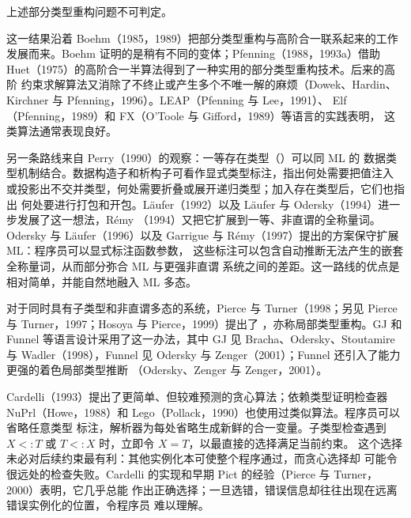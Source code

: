 \begin{theorem}[Pfenning，1993a]
\label{thm:23.6.2}
上述部分类型重构问题不可判定。
\end{theorem}

这一结果沿着 Boehm（1985，1989）把部分类型重构与高阶合一联系起来的工作
发展而来。Boehm 证明的是稍有不同的变体；Pfenning（1988，1993a）借助
Huet（1975）的高阶合一半算法得到了一种实用的部分类型重构技术。后来的高阶
约束求解算法又消除了不终止或产生多个不唯一解的麻烦（Dowek、Hardin、
Kirchner 与 Pfenning，1996）。LEAP（Pfenning 与 Lee，1991）、
Elf（Pfenning，1989）和 FX（O'Toole 与 Gifford，1989）等语言的实践表明，
这类算法通常表现良好。


另一条路线来自 Perry（1990）的观察：一等存在类型（）可以同 ML 的
数据类型机制结合。数据构造子和析构子可看作显式类型标注，指出何处需要把值注入
或投影出不交并类型，何处需要折叠或展开递归类型；加入存在类型后，它们也指出
何处要进行打包和开包。Läufer（1992）以及 Läufer 与 Odersky（1994）进一步发展了这一想法，Rémy
（1994）又把它扩展到一等、非直谓的全称量词。Odersky 与 Läufer（1996）以及
Garrigue 与 Rémy（1997）提出的方案保守扩展 ML：程序员可以显式标注函数参数，
这些标注可以包含自动推断无法产生的嵌套全称量词，从而部分弥合 ML 与更强非直谓
系统之间的差距。这一路线的优点是相对简单，并能自然地融入 ML 多态。

对于同时具有子类型和非直谓多态的系统，Pierce 与 Turner（1998；另见 Pierce
与 Turner，1997；Hosoya 与 Pierce，1999）提出了
，亦称局部类型重构。GJ 和
Funnel 等语言设计采用了这一办法，其中 GJ 见 Bracha、Odersky、Stoutamire 与
Wadler（1998），Funnel 见 Odersky 与 Zenger（2001）；Funnel 还引入了能力更强的着色局部类型推断
（Odersky、Zenger 与 Zenger，2001）。

Cardelli（1993）提出了更简单、但较难预测的贪心算法；依赖类型证明检查器
NuPrl（Howe，1988）和 Lego（Pollack，1990）也使用过类似算法。程序员可以省略任意类型
标注，解析器为每处省略生成新鲜的合一变量。子类型检查遇到
\(X<:T\) 或 \(T<:X\) 时，立即令 \(X=T\)，以最直接的选择满足当前约束。
这个选择未必对后续约束最有利：其他实例化本可使整个程序通过，而贪心选择却
可能令很远处的检查失败。Cardelli 的实现和早期 Pict 的经验（Pierce 与 Turner，
2000）表明，它几乎总能
作出正确选择；一旦选错，错误信息却往往出现在远离错误实例化的位置，令程序员
难以理解。

